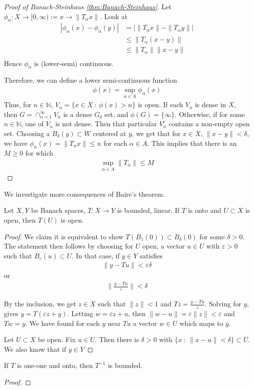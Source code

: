 \begin{proof}[Proof of Banach-Steinhaus \autoref{thm:Banach-Steinhaus}]
  \label{proof:Banach-Steinhaus}
  Let $\phi_\alpha: X \to [0, \infty):= x \to \|T_\alpha x\|$. Look at
  \begin{align*}
    |\phi_\alpha(x) - \phi_\alpha(y)| &= |\|T_\alpha x\| - \|T_\alpha y\|| \\
    &\le \|T_\alpha (x -y)\| \\
    &\le \| T_\alpha\| \|x - y\| \\
  \end{align*}
  Hence $\phi_\alpha$ is (lower-semi) continuous.

  Therefore, we can define a lower semi-continuous function
  \begin{align*}
    \phi(x) = \sup_{\alpha \in A} \phi_\alpha(x)
  \end{align*}
  Thus, for $n \in \mathbb{N}$, $V_n = \{ x \in X  \ : \  \phi(x) > n
  \}$ is open. If each $V_n$ is dense in $X$, then $G = \cap_{n =
  1}^{\infty} V_n$ is a dense $G_\delta$ set, and $\phi(G) = \{
  \infty \}$. Otherwise, if for some $n \in \mathbb{N}$, one of $V_n$
  is not dense. Then that particular $V_n^c$ contains a non-empty
  open set. Choosing a $B_\delta(y) \subset W$ centered at $y$, we
  get that for $x \in X$, $\|x - y\| < \delta$, we have
  $\phi_\alpha(x) = \|T_\alpha x\| \le n$ for each $\alpha \in A$.
  This implies that there is an $M \ge 0$ for which
  \begin{align*}
    \sup_{\alpha \in A} \|T_\alpha\| \le M
  \end{align*}
\end{proof}

We investigate more consequences of Baire's theorem.

\begin{theorem}
  Let $X, Y$ be Banach spaces, $T: X \to Y$ is bounded, linear. If
  $T$ is onto and $U \subset X$ is open, then $T(U)$ is open.
\end{theorem}
\begin{proof}
  We claim it is equivalent to show $T(B_1(0)) \subset B_\delta(0)$
  for some $\delta > 0$. The statement then follows by choosing for
  $U$ open, a vector $u \in U$ with $\varepsilon > 0$ such that
  $B_\varepsilon(u) \subset U$. In that case, if $y \in Y$ satisfies
  \begin{align*}
    \|y - Tu\| < \varepsilon \delta
  \end{align*}
  or
  \begin{align*}
    \|\frac{y-Tu}{\varepsilon}\| < \delta
  \end{align*}

  By the inclusion, we get $z \in X$ such that $\|z\| < 1$ and $Tz =
  \frac{y-Tu}{z}$. Solving for $y$, gives $y = T(\varepsilon z + y)$.
  Letting $w = \varepsilon z + u$, then $\|w - u\| = \varepsilon
  \|z\| < \varepsilon$ and $Tw = y$. We have found for each $y$ near
  $ Tu$ a vector $w \in U$ which maps to $y$.

  Let $U \subset X$ be open. Fix $u \in U$. Then there is $\delta >
  0$ with $ \{ x   \ : \  \|x - u\| < \delta \} \subset U$.
  We also know that if $y \in Y$
\end{proof}

\begin{corollary}
  If $T$ is one-one and onto, then $T^{-1}$ is bounded.
\end{corollary}
\begin{proof}

\end{proof}
